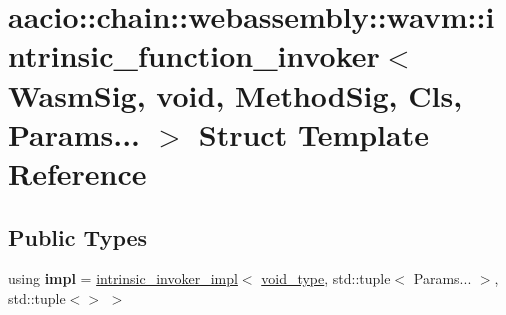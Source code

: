 \hypertarget{structaacio_1_1chain_1_1webassembly_1_1wavm_1_1intrinsic__function__invoker_3_01_wasm_sig_00_01vd3c3b831951ee6790b5589afecfb1c9b}{}\section{aacio\+:\+:chain\+:\+:webassembly\+:\+:wavm\+:\+:intrinsic\+\_\+function\+\_\+invoker$<$ Wasm\+Sig, void, Method\+Sig, Cls, Params... $>$ Struct Template Reference}
\label{structaacio_1_1chain_1_1webassembly_1_1wavm_1_1intrinsic__function__invoker_3_01_wasm_sig_00_01vd3c3b831951ee6790b5589afecfb1c9b}
\subsection*{Public Types}
\begin{DoxyCompactItemize}
\item 
\mbox{\label{structaacio_1_1chain_1_1webassembly_1_1wavm_1_1intrinsic__function__invoker_3_01_wasm_sig_00_01vd3c3b831951ee6790b5589afecfb1c9b_a47b702a47d2fa19e9cd27592c7e9ee43}} 
using {\bfseries impl} = \mbox{\hyperlink{structaacio_1_1chain_1_1webassembly_1_1wavm_1_1intrinsic__invoker__impl}{intrinsic\+\_\+invoker\+\_\+impl}}$<$ \mbox{\hyperlink{structaacio_1_1chain_1_1webassembly_1_1wavm_1_1void__type}{void\+\_\+type}}, std\+::tuple$<$ Params... $>$, std\+::tuple$<$$>$ $>$
\end{DoxyCompactItemize}
